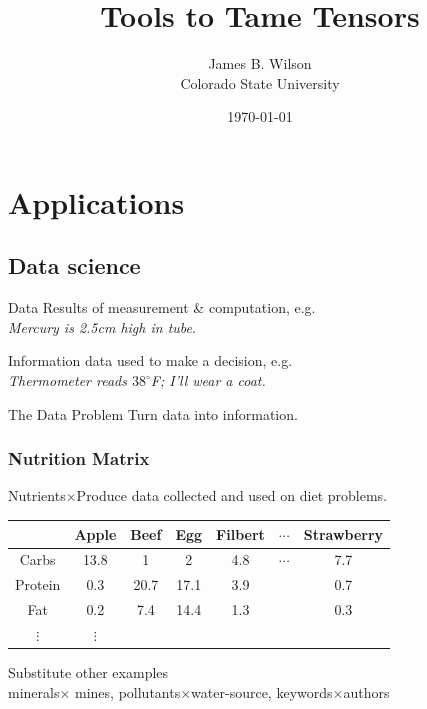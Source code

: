 \documentclass{beamer}
\begin{document}
\title{Tools to Tame Tensors}
\author{James B. Wilson\\ Colorado State University}
\date{\today}

\maketitle

\section{Applications}

\subsection{Data science}
\begin{frame} 
    \begin{block}{Data}
        Results of measurement \& computation, e.g.\\[5pt]
        \centering
        \emph{Mercury is 2.5cm high in tube}.
    \end{block}

    \begin{block}{Information}
        data used to make a decision, e.g.\\[5pt]
        \centering
        \emph{Thermometer reads $38^{\circ}$F; I'll wear a coat.} 
    \end{block}
    

    \begin{block}{The Data Problem}
        Turn data into information.
    \end{block}

\end{frame}


\begin{frame}
    \frametitle{Nutrition Matrix}
    Nutrients$\times$Produce data collected and used on diet problems.
    \bigskip 

    \begin{tabular}{c|cccccc|}
             & Apple & Beef & Egg & Filbert & $\cdots$ & Strawberry \\
    \hline
    Carbs    & 13.8  & 1    & 2    & 4.8    & $\cdots$  & 7.7 \\
    Protein  & 0.3   & 20.7 & 17.1 & 3.9    &  & 0.7 \\
    Fat      & 0.2   & 7.4  & 14.4 & 1.3    &  & 0.3 \\
    $\vdots $ & $\vdots$ & & & & &\\
    \hline 
    \end{tabular} 

    \bigskip
    Substitute other examples\\
     minerals$\times$ mines, pollutants$\times$water-source, 
    keywords$\times$authors
\end{frame}
\end{document}

